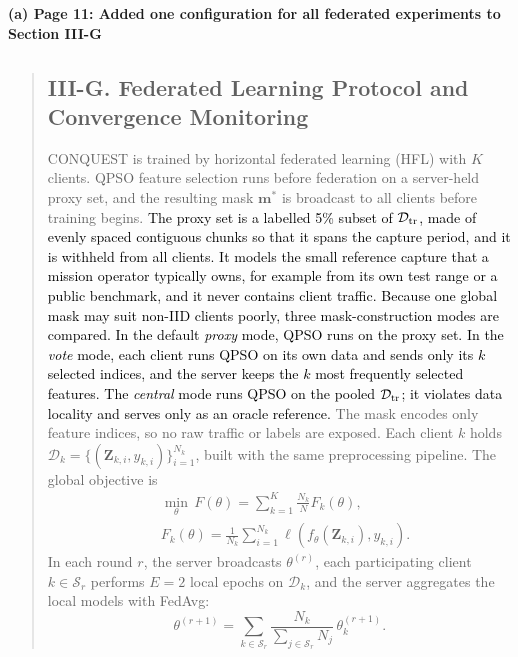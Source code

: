 \documentclass[11pt]{article}
\newenvironment{excerpt}{\begin{quote}\sloppy}{\end{quote}}
\newcommand{\mshead}[2]{\subsection*{\textbf{#1. #2}}}
\newcommand{\loc}[1]{\par\medskip\noindent\textbf{#1}\par}
\begin{document}
\loc{(a) Page 11: Added one configuration for all federated experiments to Section III-G}
\begin{excerpt}
\mshead{III-G}{Federated Learning Protocol and Convergence Monitoring}


CONQUEST is trained by horizontal federated learning (HFL) with $K$
clients. QPSO feature selection runs before federation on a
server-held proxy set, and the resulting mask $\mathbf{m}^{*}$ is
broadcast to all clients before training begins.
\textcolor{black}{The proxy set is a labelled 5\% subset of
$\mathcal{D}_{\rm tr}$, made of evenly spaced contiguous chunks so
that it spans the capture period, and it is withheld from all
clients. It models the small reference capture that a mission
operator typically owns, for example from its own test range or a
public benchmark, and it never contains client traffic. Because one
global mask may suit non-IID clients poorly, three mask-construction
modes are compared. In the default \textit{proxy} mode, QPSO runs on
the proxy set. In the \textit{vote} mode, each client runs QPSO on its
own data and sends only its $k$ selected indices, and the server
keeps the $k$ most frequently selected features. The
\textit{central} mode runs QPSO on the pooled $\mathcal{D}_{\rm tr}$;
it violates data locality and serves only as an oracle reference.}
The mask encodes only feature indices, so no raw traffic or labels
are exposed. Each client $k$ holds
$\mathcal{D}_k=\{(\mathbf{Z}_{k,i},y_{k,i})\}_{i=1}^{N_k}$, built with
the same preprocessing pipeline. The global objective is
\begin{equation}
\begin{aligned}
&\min_{\theta}\,F(\theta)=\sum_{k=1}^{K}\frac{N_k}{N}F_k(\theta),\\
&F_k(\theta)=\frac{1}{N_k}\sum_{i=1}^{N_k}
\ell\!\left(f_\theta(\mathbf{Z}_{k,i}),y_{k,i}\right).
\end{aligned}
\tag{19}
\end{equation}
In each round $r$, the server broadcasts $\theta^{(r)}$, each
participating client $k\in\mathcal{S}_r$ performs $E=2$ local epochs
on $\mathcal{D}_k$, and the server aggregates the local models with
FedAvg:
\begin{equation}
\theta^{(r+1)}=\sum_{k\in\mathcal{S}_r}
\frac{N_k}{\sum_{j\in\mathcal{S}_r}N_j}
\,\theta_k^{(r+1)}.
\tag{20}
\end{equation}


\end{excerpt}
\end{document}
